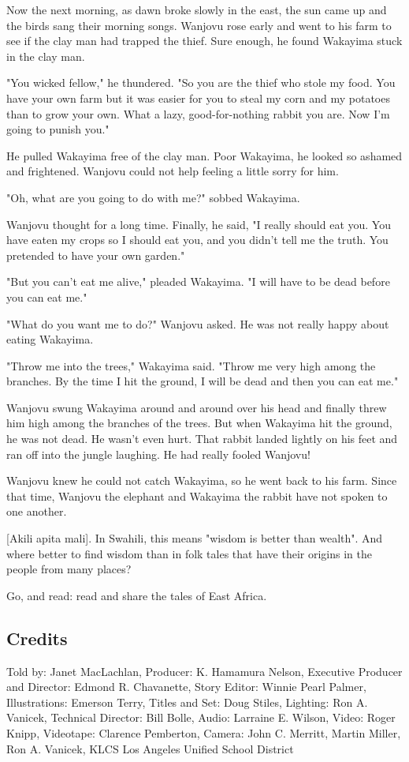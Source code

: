 Now the next morning, as dawn broke slowly in the east, the sun came up and the birds sang their morning songs. Wanjovu rose early and went to his farm to see if the clay man had trapped the thief. Sure enough, he found Wakayima stuck in the clay man.

"You wicked fellow," he thundered. "So you are the thief who stole my food. You have your own farm but it was easier for you to steal my corn and my potatoes than to grow your own. What a lazy, good-for-nothing rabbit you are. Now I'm going to punish you."

He pulled Wakayima free of the clay man. Poor Wakayima, he looked so ashamed and frightened. Wanjovu could not help feeling a little sorry for him.

"Oh, what are you going to do with me?" sobbed Wakayima.

Wanjovu thought for a long time. Finally, he said, "I really should eat you. You have eaten my crops so I should eat you, and you didn't tell me the truth. You pretended to have your own garden."

"But you can't eat me alive," pleaded Wakayima. "I will have to be dead before you can eat me."

"What do you want me to do?" Wanjovu asked. He was not really happy about eating Wakayima.

"Throw me into the trees," Wakayima said. "Throw me very high among the branches. By the time I hit the ground, I will be dead and then you can eat me."

Wanjovu swung Wakayima around and around over his head and finally threw him high among the branches of the trees. But when Wakayima hit the ground, he was not dead. He wasn't even hurt. That rabbit landed lightly on his feet and ran off into the jungle laughing. He had really fooled Wanjovu!

Wanjovu knew he could not catch Wakayima, so he went back to his farm. Since that time, Wanjovu the elephant and Wakayima the rabbit have not spoken to one another.

    [Akili apita mali]. In Swahili, this means "wisdom is better than wealth". And where better to find wisdom than in folk tales that have their origins in the people from many places?

Go, and read: read and share the tales of East Africa.

\subsection{Credits}

Told by: Janet MacLachlan,
Producer: K. Hamamura Nelson,
Executive Producer and Director: Edmond R. Chavanette,
Story Editor: Winnie Pearl Palmer,
Illustrations: Emerson Terry,
Titles and Set: Doug Stiles,
Lighting: Ron A. Vanicek,
Technical Director: Bill Bolle,
Audio: Larraine E. Wilson,
Video: Roger Knipp,
Videotape: Clarence Pemberton,
Camera: John C. Merritt, Martin Miller, Ron A. Vanicek,
KLCS Los Angeles Unified School District